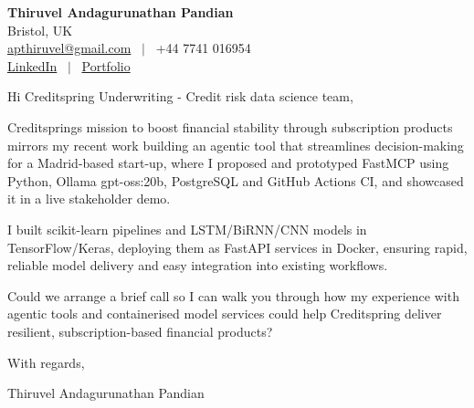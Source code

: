 \documentclass[11pt,a4paper]{article}
\begin{document}
\raggedright
\pagestyle{empty}

\begin{center}
    {\LARGE \color{linkblue} \textbf{Thiruvel Andagurunathan Pandian}}\\[0.2cm]
    Bristol, UK \\
    \href{mailto:apthiruvel@gmail.com}{apthiruvel@gmail.com} \ $|$ \ +44 7741 016954 \\
\href{https://www.linkedin.com/in/thiruvel-a-p/}{LinkedIn} \ $|$ \ \href{https://thiruvel-ap.github.io/PersonalPortfolio/}{Portfolio}
\end{center}

\vspace{0.4cm}

\noindent
Hi Creditspring Underwriting - Credit risk data science team,

Creditspring\textquotesingle{}s mission to boost financial stability through subscription products mirrors my recent work building an agentic tool that streamlines decision-making for a Madrid-based start-up, where I proposed and prototyped FastMCP using Python, Ollama gpt-oss:20b, PostgreSQL and GitHub Actions CI, and showcased it in a live stakeholder demo.

I built scikit-learn pipelines and LSTM/BiRNN/CNN models in TensorFlow/Keras, deploying them as FastAPI services in Docker, ensuring rapid, reliable model delivery and easy integration into existing workflows.

Could we arrange a brief call so I can walk you through how my experience with agentic tools and containerised model services could help Creditspring deliver resilient, subscription-based financial products?

\vspace{0.5cm}

With regards,

Thiruvel Andagurunathan Pandian
\end{document}

